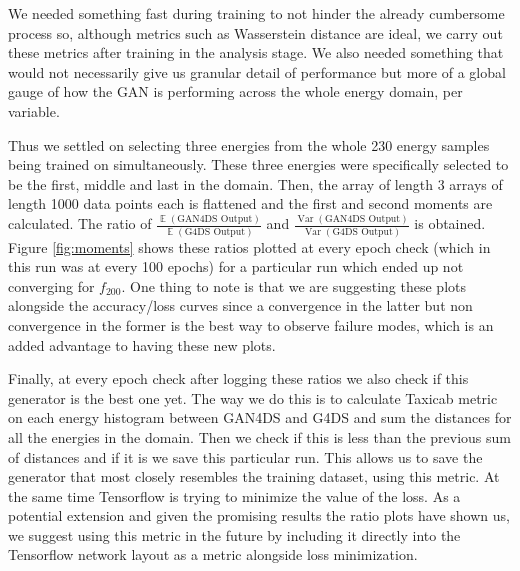 \documentclass[11pt]{article} %
\DeclareMathOperator{\E}{\mathbb{E}}
\DeclareMathOperator{\Var}{\mathrm{Var}}
\begin{document}
We needed something fast during training to not hinder the already cumbersome process so, although metrics
such as Wasserstein distance are ideal, we carry out these metrics after training in the analysis stage.
We also needed something that would not necessarily give us granular detail of performance but more
of a global gauge of how the GAN is performing across the whole energy domain, per variable.
\\
\par Thus we settled on selecting three energies from the whole 230 energy samples being trained on simultaneously.
These three energies were specifically selected to be the first, middle and last in the domain.
Then, the array of length 3 arrays of length 1000 data points each is flattened and the first and second moments are calculated.
The ratio of $\frac{\E(\text{GAN4DS Output})}{\E(\text{G4DS Output})}$ and $\frac{\Var(\text{GAN4DS Output})}{\Var(\text{G4DS Output})}$ is obtained.
Figure \ref{fig:moments} shows these ratios plotted at every epoch check (which in this run was at every 100 epochs) for a particular run
which ended up not converging for $f_{200}$.
One thing to note is that we are suggesting these plots alongside the accuracy/loss curves since a convergence in the latter
but non convergence in the former is the best way to observe failure modes, which is an added advantage to having these new plots.
\\
\par Finally, at every epoch check after logging these ratios we also check if this generator is the best one yet.
The way we do this is to calculate Taxicab metric on each energy histogram between GAN4DS and G4DS and sum the distances for all the energies in the domain.
Then we check if this is less than the previous sum of distances and if it is we save this particular run.
This allows us to save the generator that most closely resembles the training dataset, using this metric.
At the same time Tensorflow is trying to minimize the value of the loss.
As a potential extension and given the promising results the ratio plots have shown us, we
suggest using this metric in the future by including it directly into the Tensorflow network layout as a metric alongside loss minimization.
\end{document}
